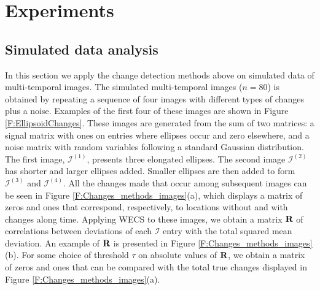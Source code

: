 \documentclass[journal]{IEEEtran}
\newcommand{\vR}{{\textbf R}}
\begin{document}
\section{Experiments}

\subsection{Simulated data analysis}\label{secExpSimulated}

In this section we apply the change detection methods above on simulated data of multi-temporal images. The simulated multi-temporal images ($n=80$) is obtained by repeating a sequence of four images with different types of changes plus a noise. Examples of the first four of these images are shown in Figure \ref{F:EllipsoidChanges}. These images are generated from the sum of two matrices: a signal matrix with ones on entries where ellipses occur and zero elsewhere, and a noise matrix with random variables following a standard Gaussian distribution. The first image, $\mathcal{I}^{(1)}$, presents three elongated ellipses. The second image $\mathcal{I}^{(2)}$ has shorter and larger ellipses added. Smaller ellipses are then added to form $\mathcal{I}^{(3)}$ and $\mathcal{I}^{(4)}$. All the changes made that occur among subsequent images can be seen in Figure \ref{F:Changes_methods_images}(a), which displays a matrix of zeros and ones that correspond, respectively, to locations without and with changes along time. Applying WECS to these images, we obtain a matrix $\vR$ of correlations between deviations of each $\mathcal{I}$ entry with the total squared mean deviation. An example of $\vR$ is presented in Figure \ref{F:Changes_methods_images}(b). For some choice of threshold $\tau$ on absolute values of $\vR$, we obtain a matrix of zeros and ones that can be compared with the total true changes displayed in Figure \ref{F:Changes_methods_images}(a).
\end{document}
